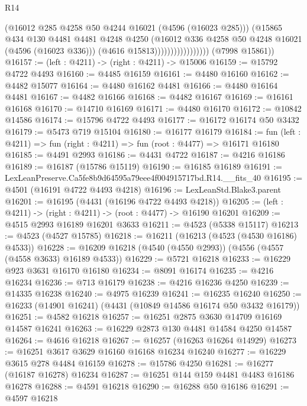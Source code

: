 \begin{lexlean}{R14}
\begin{coremodule}
                                    (@16012 @285 @4258 @50 @4244 @16021 (@4596 (@16023 @285)))
                                    (@15865
                                      @434
                                      @130
                                      @4481
                                      @4481
                                      @4248
                                      @4250
                                      (@16012 @336 @4258 @50 @4248 @16021 (@4596 (@16023 @336)))
                                      (@4616 @15813)))))))))))))))))
      (@7998 @15861))
@16157 := (left : @4211) -> (right : @4211) -> @15006
@16159 := @15792 @4722 @4493
@16160 := @4485 @16159
@16161 := @4480 @16160
@16162 := @4482 @15077
@16164 := @4480 @16162 @4481
@16166 := @4480 @16164 @4481
@16167 := @4482 @16166
@16168 := @4482 @16167
@16169 := @16161 @16168
@16170 := @14710 @16169
@16171 := @4480 @16170
@16172 := @10842 @14586
@16174 := @15796 @4722 @4493
@16177 := @16172 @16174 @50 @3432
@16179 := @5473 @719 @15104
@16180 := @16177 @16179
@16184 := fun (left : @4211) => fun (right : @4211) => fun (root : @4477) => @16171 @16180
@16185 := @4491 @2993
@16186 := @4431 @4722
@16187 := @4216 @16186
@16189 := @16187 (@15786 @15119)
@16190 := @16185 @16189
@16191 := LexLeanPreserve.Ca5fe8b9d64595a79eee4f004915717bd.R14.__fits_40
@16195 := @4501 (@16191 @4722 @4493 @4218)
@16196 := LexLeanStd.Blake3.parent
@16201 := @16195 (@4431 (@16196 @4722 @4493 @4218))
@16205 := (left : @4211) -> (right : @4211) -> (root : @4477) -> @16190 @16201
@16209 := @4515 @2993 @16189 @16201 @3633
@16211 := @4523 (@5338 @15117)
@16213 := @4523 (@4527 @15785)
@16218 := @16211 (@16213 (@4523 (@4530 @16186) @4533))
@16228 := @16209 @16218 (@4540 (@4550 @2993)) (@4556 (@4557 (@4558 @3633) @16189 @4533))
@16229 := @5721 @16218
@16233 := @16229 @923 @3631 @16170 @16180
@16234 := @8091 @16174
@16235 := @4216 @16234
@16236 := @713 @16179
@16238 := @4216 @16236 @4250
@16239 := @14335 @16238
@16240 := @4975 @16239
@16241 := @16235 @16240
@16250 := @16233 (@14901 @16241) (@4431 (@10849 @14586 @16174 @50 @3432 @16179))
@16251 := @4582 @16218
@16257 := @16251 @2875 @3630 @14709 @16169 @14587 @16241
@16263 := @16229 @2873 @130 @4481 @14584 @4250 @14587
@16264 := @4616 @16218
@16267 := @16257 (@16263 @16264 @14929)
@16273 := @16251 @3617 @3629 @16160 @16168 @16234 @16240
@16277 := @16229 @3615 @278 @4484 @16159
@16278 := @15786 @4250
@16281 := @16277 (@16187 @16278) @16234
@16287 := @16251 @144 @159 @4481 @4483 @16186 @16278
@16288 := @4591 @16218
@16290 := @16288 @50 @16186
@16291 := @4597 @16218

\end{coremodule}
\end{lexlean}
